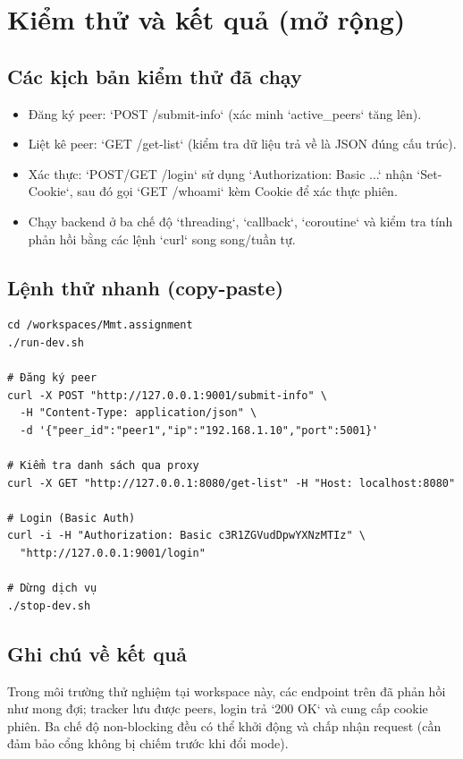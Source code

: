\documentclass[a4paper,12pt]{article}
\begin{document}
\section{Kiểm thử và kết quả (mở rộng)}
\subsection{Các kịch bản kiểm thử đã chạy}
\begin{itemize}
  \item Đăng ký peer: `POST /submit-info` (xác minh `active_peers` tăng lên).
  \item Liệt kê peer: `GET /get-list` (kiểm tra dữ liệu trả về là JSON đúng cấu trúc).
  \item Xác thực: `POST/GET /login` sử dụng `Authorization: Basic ...` nhận `Set-Cookie`, sau đó gọi `GET /whoami` kèm Cookie để xác thực phiên.
  \item Chạy backend ở ba chế độ `threading`, `callback`, `coroutine` và kiểm tra tính phản hồi bằng các lệnh `curl` song song/tuần tự.
\end{itemize}

\subsection{Lệnh thử nhanh (copy-paste)}
\begin{verbatim}
cd /workspaces/Mmt.assignment
./run-dev.sh

# Đăng ký peer
curl -X POST "http://127.0.0.1:9001/submit-info" \
  -H "Content-Type: application/json" \
  -d '{"peer_id":"peer1","ip":"192.168.1.10","port":5001}'

# Kiểm tra danh sách qua proxy
curl -X GET "http://127.0.0.1:8080/get-list" -H "Host: localhost:8080"

# Login (Basic Auth)
curl -i -H "Authorization: Basic c3R1ZGVudDpwYXNzMTIz" \
  "http://127.0.0.1:9001/login"

# Dừng dịch vụ
./stop-dev.sh
\end{verbatim}

\subsection{Ghi chú về kết quả}
Trong môi trường thử nghiệm tại workspace này, các endpoint trên đã phản hồi như mong đợi; tracker lưu được peers, login trả `200 OK` và cung cấp cookie phiên. Ba chế độ non-blocking đều có thể khởi động và chấp nhận request (cần đảm bảo cổng không bị chiếm trước khi đổi mode).
\end{document}
